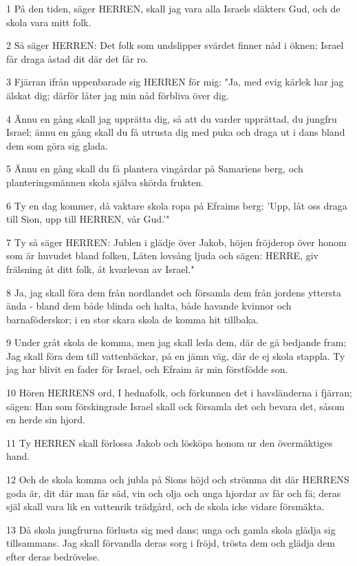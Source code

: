 \par 1 På den tiden, säger HERREN, skall jag vara alla Israels släkters Gud, och de skola vara mitt folk.
\par 2 Så säger HERREN: Det folk som undslipper svärdet finner nåd i öknen; Israel får draga åstad dit där det får ro.
\par 3 Fjärran ifrån uppenbarade sig HERREN för mig: "Ja, med evig kärlek har jag älskat dig; därför låter jag min nåd förbliva över dig.
\par 4 Ännu en gång skall jag upprätta dig, så att du varder upprättad, du jungfru Israel; ännu en gång skall du få utrusta dig med puka och draga ut i dans bland dem som göra sig glada.
\par 5 Ännu en gång skall du få plantera vingårdar på Samariens berg, och planteringsmännen skola själva skörda frukten.
\par 6 Ty en dag kommer, då vaktare skola ropa på Efraims berg: 'Upp, låt oss draga till Sion, upp till HERREN, vår Gud.'"
\par 7 Ty så säger HERREN: Jublen i glädje över Jakob, höjen fröjderop över honom som är huvudet bland folken, Låten lovsång ljuda och sägen: HERRE, giv frälsning åt ditt folk, åt kvarlevan av Israel."
\par 8 Ja, jag skall föra dem från nordlandet och församla dem från jordens yttersta ända - bland dem både blinda och halta, både havande kvinnor och barnaföderskor; i en stor skara skola de komma hit tillbaka.
\par 9 Under gråt skola de komma, men jag skall leda dem, där de gå bedjande fram; Jag skall föra dem till vattenbäckar, på en jämn väg, där de ej skola stappla. Ty jag har blivit en fader för Israel, och Efraim är min förstfödde son.
\par 10 Hören HERRENS ord, I hednafolk, och förkunnen det i havsländerna i fjärran; sägen: Han som förskingrade Israel skall ock församla det och bevara det, såsom en herde sin hjord.
\par 11 Ty HERREN skall förlossa Jakob och lösköpa honom ur den övermäktiges hand.
\par 12 Och de skola komma och jubla på Sions höjd och strömma dit där HERRENS goda är, dit där man får säd, vin och olja och unga hjordar av får och fä; deras själ skall vara lik en vattenrik trädgård, och de skola icke vidare försmäkta.
\par 13 Då skola jungfrurna förlusta sig med dans; unga och gamla skola glädja sig tillsammans. Jag skall förvandla deras sorg i fröjd, trösta dem och glädja dem efter deras bedrövelse.
